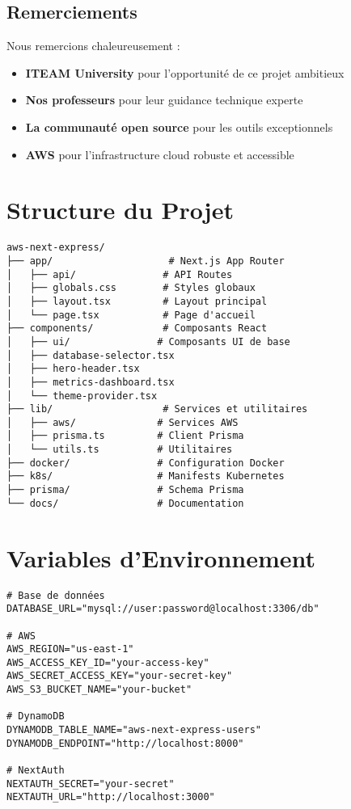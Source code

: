 \documentclass[12pt,a4paper]{report}
\begin{document}
\section{Remerciements}

Nous remercions chaleureusement :
\begin{itemize}
    \item \textbf{ITEAM University} pour l'opportunité de ce projet ambitieux
    \item \textbf{Nos professeurs} pour leur guidance technique experte
    \item \textbf{La communauté open source} pour les outils exceptionnels
    \item \textbf{AWS} pour l'infrastructure cloud robuste et accessible
\end{itemize}

\appendix

\chapter{Structure du Projet}

\begin{verbatim}
aws-next-express/
├── app/                    # Next.js App Router
│   ├── api/               # API Routes
│   ├── globals.css        # Styles globaux
│   ├── layout.tsx         # Layout principal
│   └── page.tsx           # Page d'accueil
├── components/            # Composants React
│   ├── ui/               # Composants UI de base
│   ├── database-selector.tsx
│   ├── hero-header.tsx
│   ├── metrics-dashboard.tsx
│   └── theme-provider.tsx
├── lib/                   # Services et utilitaires
│   ├── aws/              # Services AWS
│   ├── prisma.ts         # Client Prisma
│   └── utils.ts          # Utilitaires
├── docker/               # Configuration Docker
├── k8s/                  # Manifests Kubernetes
├── prisma/               # Schema Prisma
└── docs/                 # Documentation
\end{verbatim}

\chapter{Variables d'Environnement}

\begin{lstlisting}[caption=Configuration environnement]
# Base de données
DATABASE_URL="mysql://user:password@localhost:3306/db"

# AWS
AWS_REGION="us-east-1"
AWS_ACCESS_KEY_ID="your-access-key"
AWS_SECRET_ACCESS_KEY="your-secret-key"
AWS_S3_BUCKET_NAME="your-bucket"

# DynamoDB
DYNAMODB_TABLE_NAME="aws-next-express-users"
DYNAMODB_ENDPOINT="http://localhost:8000"

# NextAuth
NEXTAUTH_SECRET="your-secret"
NEXTAUTH_URL="http://localhost:3000"
\end{lstlisting}
\end{document}
